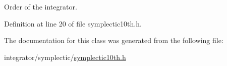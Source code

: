 Order of the integrator. 



Definition at line 20 of file symplectic10th.\+h.



The documentation for this class was generated from the following file\+:\begin{DoxyCompactItemize}
\item 
integrator/symplectic/\mbox{\hyperlink{symplectic10th_8h}{symplectic10th.\+h}}\end{DoxyCompactItemize}
